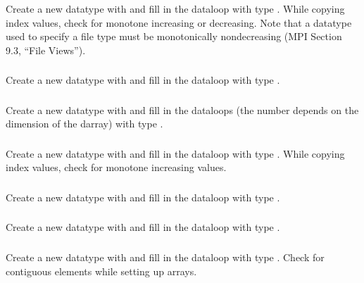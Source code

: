 \documentclass{article}
\begin{document}
\subsubsection{}
Create a new datatype with  and fill in the dataloop
with type .
While copying index values, check for monotone increasing or
decreasing.  Note that a datatype used to specify a file type must be
monotonically nondecreasing (MPI Section 9.3, ``File Views'').

\subsubsection{}
Create a new datatype with  and fill in the dataloop
with type .

\subsubsection{}
Create a new datatype with  and fill in the
dataloops (the number depends on the dimension of the darray) 
with type .

\subsubsection{}
Create a new datatype with  and fill in the dataloop
with type .  While copying index values, check
for monotone increasing values.

\subsubsection{}
Create a new datatype with  and fill in the dataloop
with type .

\subsubsection{}
Create a new datatype with  and fill in the dataloop
with type .

\subsubsection{}
Create a new datatype with  and fill in the dataloop
with type .  Check for contiguous elements
while setting up arrays.
\end{document}
